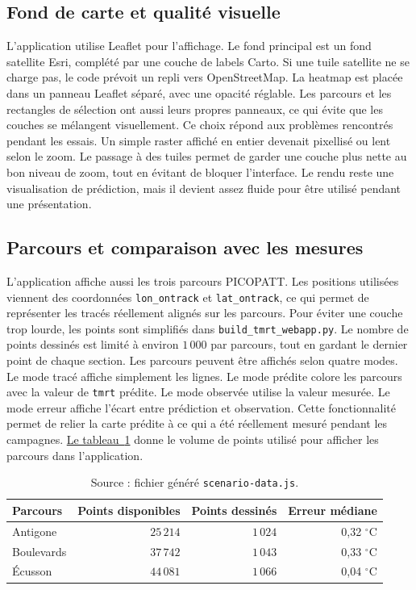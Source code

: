 \documentclass{article}
\begin{document}
\subsection{Fond de carte et qualité visuelle}

L'application utilise Leaflet pour l'affichage. Le fond principal est un fond satellite Esri, complété par une couche de labels Carto. Si une tuile satellite ne se charge pas, le code prévoit un repli vers OpenStreetMap. La heatmap est placée dans un panneau Leaflet séparé, avec une opacité réglable. Les parcours et les rectangles de sélection ont aussi leurs propres panneaux, ce qui évite que les couches se mélangent visuellement.
Ce choix répond aux problèmes rencontrés pendant les essais. Un simple raster affiché en entier devenait pixellisé ou lent selon le zoom. Le passage à des tuiles permet de garder une couche plus nette au bon niveau de zoom, tout en évitant de bloquer l'interface. Le rendu reste une visualisation de prédiction, mais il devient assez fluide pour être utilisé pendant une présentation.

\subsection{Parcours et comparaison avec les mesures}

L'application affiche aussi les trois parcours PICOPATT. Les positions utilisées viennent des coordonnées \texttt{lon\_ontrack} et \texttt{lat\_ontrack}, ce qui permet de représenter les tracés réellement alignés sur les parcours. Pour éviter une couche trop lourde, les points sont simplifiés dans \texttt{build\_tmrt\_webapp.py}. Le nombre de points dessinés est limité à environ \(1\,000\) par parcours, tout en gardant le dernier point de chaque section.
Les parcours peuvent être affichés selon quatre modes. Le mode tracé affiche simplement les lignes. Le mode prédite colore les parcours avec la valeur de \texttt{tmrt} prédite. Le mode observée utilise la valeur mesurée. Le mode erreur affiche l'écart entre prédiction et observation. Cette fonctionnalité permet de relier la carte prédite à ce qui a été réellement mesuré pendant les campagnes.
\hyperref[tab:webapp-routes]{Le tableau~\ref{tab:webapp-routes}} donne le volume de points utilisé pour afficher les parcours dans l'application.

\begin{table}[H]
\centering
\small
\begin{tabular}{lrrr}
\toprule
Parcours & Points disponibles & Points dessinés & Erreur médiane \\
\midrule
Antigone & \(25\,214\) & \(1\,024\) & 0,32 \(^{\circ}\mathrm{C}\) \\
Boulevards & \(37\,742\) & \(1\,043\) & 0,33 \(^{\circ}\mathrm{C}\) \\
Écusson & \(44\,081\) & \(1\,066\) & 0,04 \(^{\circ}\mathrm{C}\) \\
\bottomrule
\end{tabular}
\caption{Données de parcours préparées pour l'application web.}
\label{tab:webapp-routes}
\vspace{-0.35cm}
\caption*{\footnotesize Source : fichier généré \texttt{scenario-data.js}.}
\end{table}
\end{document}
